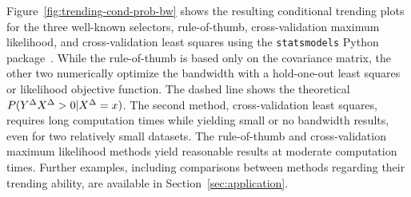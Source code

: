Figure~\ref{fig:trending-cond-prob-bw} shows the resulting conditional trending plots for the three well-known selectors, rule-of-thumb, cross-validation maximum likelihood, and cross-validation least squares using the \verb|statsmodels| Python package~\parencite{Seabold2010}.
While the rule-of-thumb is based only on the covariance matrix, the other two numerically optimize the bandwidth with a hold-one-out least squares or likelihood objective function.
The dashed line shows the theoretical $P(Y^{\Delta} X^{\Delta} > 0 | X^{\Delta} = x)$.
The second method, cross-validation least squares, requires long computation times while yielding small or no bandwidth results, even for two relatively small datasets.
The rule-of-thumb and cross-validation maximum likelihood methods yield reasonable results at moderate computation times. 
Further examples, including comparisons between methods regarding their trending ability, are available in Section~\ref{sec:application}.

